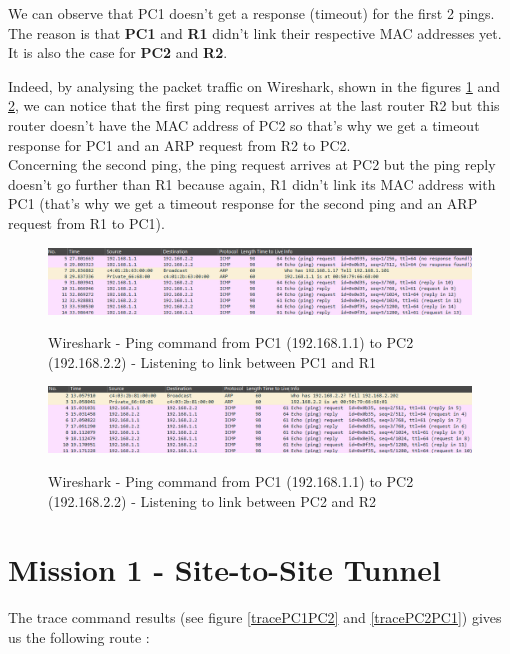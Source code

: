 \documentclass[10pt,a4paper]{ULBreport}
\begin{document}
We can observe that PC1 doesn't get a response (timeout) for the first 2 pings.
The reason is that \textbf{PC1} and \textbf{R1} didn't link their respective MAC addresses yet. It is also the case for \textbf{PC2} and \textbf{R2}.
\par
Indeed, by analysing the packet traffic on Wireshark, shown in the figures \ref{pingPC1PC2} and \ref{pingPC1PC22}, we can notice that the first ping request arrives at the last router R2 but this router doesn't have the MAC address of PC2 so that's why we get a timeout response for PC1 and an ARP request from R2 to PC2. \\
Concerning the second ping, the ping request arrives at PC2 but the ping reply doesn't go further than R1 because again, R1 didn't link its MAC address with PC1 (that's why we get a timeout response for the second ping and an ARP request from R1 to PC1).

\begin{figure}[H]
    \caption{Wireshark - Ping command from PC1 (192.168.1.1) to PC2 (192.168.2.2) - Listening to link between PC1 and R1}
    \centering
    \includegraphics[width=\textwidth]{Images/pingPC1PC2.png}
    \label{pingPC1PC2}
\end{figure}

\begin{figure}[H]
    \caption{Wireshark - Ping command from PC1 (192.168.1.1) to PC2 (192.168.2.2) - Listening to link between PC2 and R2}
    \centering
    \includegraphics[width=\textwidth]{Images/pingPC1PC22.png}
    \label{pingPC1PC22}
\end{figure}


\chapter{Mission 1 - Site-to-Site Tunnel}




The trace command results (see figure \ref{tracePC1PC2} and \ref{tracePC2PC1}) gives us the following route :
\end{document}
